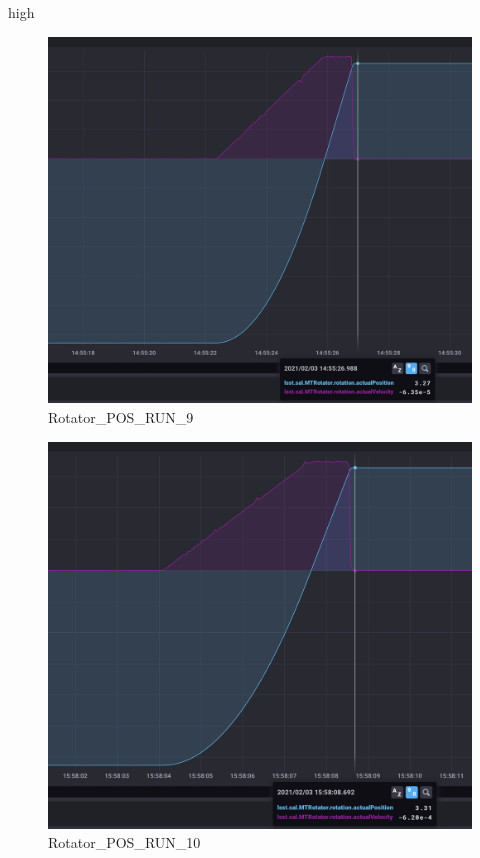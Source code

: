 high\documentclass[SE,lsstdraft,authoryear,toc]{lsstdoc}
\begin{document}
\begin{figure}[h!]
  \includegraphics[width=\linewidth]{media/Rotator_design_speed_pos_test9.png}
  \caption{Rotator\_POS\_RUN\_9}
  \label{fig:Rotator_POS_RUN_9}
\end{figure}
\begin{figure}[h!]
  \includegraphics[width=\linewidth]{media/Rotator_design_speed_pos_test10.png}
  \caption{Rotator\_POS\_RUN\_10}
  \label{fig:Rotator_POS_RUN_10}
\end{figure}
\end{document}
